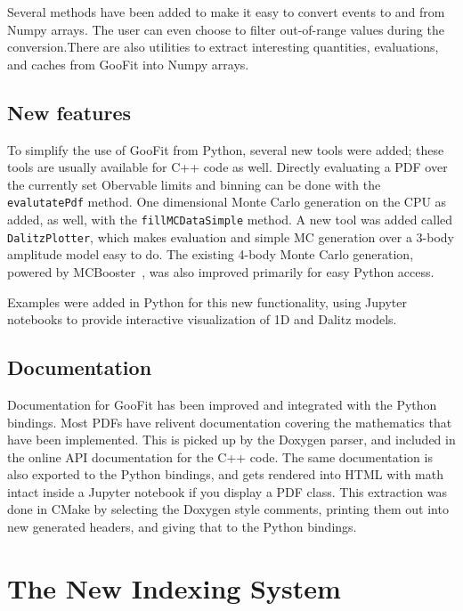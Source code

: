 \documentclass{webofc}
\begin{document}
Several methods have been added to make it easy to convert events to and from Numpy arrays. The user can even choose to filter out-of-range values during the conversion.There are also utilities to extract interesting quantities, evaluations, and caches from GooFit into Numpy arrays. 

\subsection{New features}

To simplify the use of GooFit from Python, several new tools were added; these tools are usually available for C++ code as well. Directly evaluating a PDF over the currently set Obervable limits and binning can be done with the \texttt{evalutatePdf} method. One dimensional Monte Carlo generation on the CPU as added, as well, with the \texttt{fillMCDataSimple} method. A new tool was added called \texttt{DalitzPlotter}, which makes evaluation and simple MC generation over a 3-body amplitude model easy to do. The existing 4-body Monte Carlo generation, powered by MCBooster~\cite{lib:MCBooster}, was also improved primarily for easy Python access.

Examples were added in Python for this new functionality, using Jupyter notebooks to provide interactive visualization of 1D and Dalitz models.

\subsection{Documentation}

Documentation for GooFit has been improved and integrated with the Python bindings. Most PDFs have relivent documentation covering the mathematics that have been implemented. This is picked up by the Doxygen parser, and included in the online API documentation for the C++ code. The same documentation is also exported to the Python bindings, and gets rendered into HTML with math intact inside a Jupyter notebook if you display a PDF class. This extraction was done in CMake by selecting the Doxygen style comments, printing them out into new generated headers, and giving that to the Python bindings.

\section{The New Indexing System}
\label{sec-ind}
\end{document}
